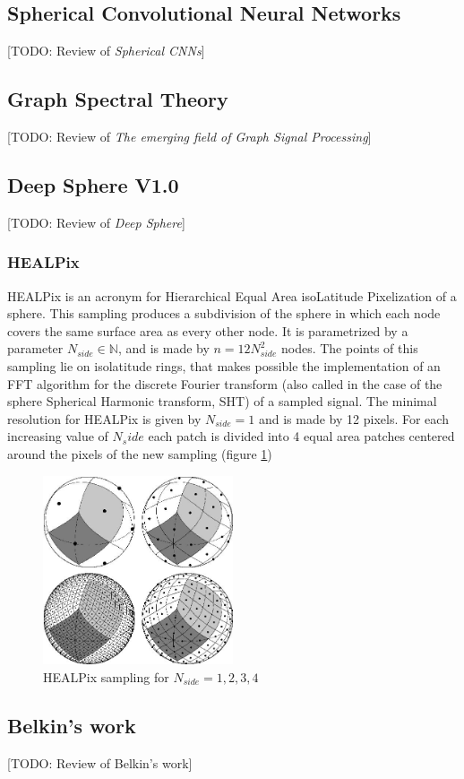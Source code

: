 \subsection{Spherical Convolutional Neural Networks}
[TODO: Review of \textit{Spherical CNNs}]
\subsection{Graph Spectral Theory} \label{sec:Chapter1: Spectral Graph Theory}
[TODO: Review of \textit{The emerging field of Graph Signal Processing}]
\subsection{Deep Sphere V1.0}\label{sec:Chapter1:DeepSphere}
[TODO: Review of \textit{Deep Sphere}]
\subsubsection{HEALPix}\label{sec:Chapter1:HEALPix}
HEALPix is an acronym for Hierarchical Equal Area isoLatitude Pixelization of a sphere. This sampling produces a subdivision of the sphere in which each node covers the same surface area as every other node. It is parametrized by a parameter $N_{side}\in\mathbb N$, and is made by $n=12N_{side}^2$ nodes. The points of this sampling lie on isolatitude rings, that makes possible the implementation of an FFT algorithm for the discrete Fourier transform (also called in the case of the sphere Spherical Harmonic transform, SHT) of a sampled signal. The minimal resolution for HEALPix is given by $N_{side}=1$ and is made by 12 pixels. For each increasing value of $N_side$ each patch is divided into 4 equal area patches centered around the pixels of the new sampling (figure \ref{fig:healpix sampling})
\begin{figure}
	\centering
	\includegraphics[width=0.5\textwidth]{figs/chapter1/healpix.jpg}
	\caption{\label{fig:healpix sampling}HEALPix sampling for $N_{side}=1,2,3,4$}
\end{figure}
\subsection{Belkin's work}
[TODO: Review of Belkin's work]

